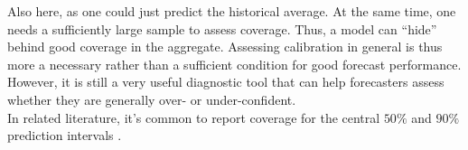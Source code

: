 Also here, as one could just predict the historical average. At the same time, one needs a sufficiently large sample to assess coverage. Thus, a model can ``hide'' behind good coverage in the aggregate. Assessing calibration in general is thus more a necessary rather than a sufficient condition for good forecast performance. However, it is still a very useful diagnostic tool that can help forecasters assess whether they are generally over- or under-confident.\\ 
In related literature, it's common to report coverage for the central $50\%$ and $90\%$ prediction intervals .
